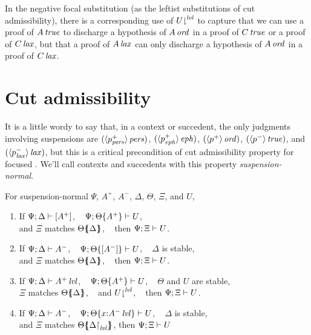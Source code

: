 In the negative focal substitution (as the leftist substitutions of
cut admissibility), there is a corresponding use of
${U}{\downharpoonright}^{{\it lvl}}$ to capture that we can use a proof of
${A}\,{{\it true}}$ to discharge a hypothesis of ${A}\,{{\it ord}}$ in a proof of
${C}\,{{\it true}}$ or a proof of ${C}\,{{\it lax}}$, but that a proof of
${A}\,{{\it lax}}$ can only discharge a hypothesis of ${A}\,{{\it ord}}$ in a proof
of ${C}\,{{\it lax}}$. 



\section{Cut admissibility}
\label{sec:ord-cut}

It is a little wordy to say that, in a context or succedent, the only
judgments involving suspensions are $({\langle {p^+_{\it pers}} \rangle}\,{{\it pers}})$,
$({\langle {p^+_{\it eph}} \rangle}\,{{\it eph}})$, $({\langle {p^+} \rangle}\,{{\it ord}})$,
$({\langle {p^-} \rangle}\,{{\it true}})$, and $({\langle {p^-_{\it lax}} \rangle}\,{{\it lax}})$, but this is a
critical precondition of cut admissibility property for focused
\ollll. We'll call contexts and succedents with this property {\it
  suspension-normal}.

\bigskip
\begin{theorem}\label{thm:ord-cut}
For suspension-normal $\Psi$, $A^+$, $A^-$, $\Delta$, $\Theta$, $\Xi$, and $U$,
\begin{enumerate}
\item If ${\Psi};{\Delta} \vdash {[ A^+ ]} \mathstrut$, ~
         ${\Psi};{{\Theta}\{{A^+}\}} \vdash {U} \mathstrut$,\\
      and $\Xi$ matches ${\Theta}\mbox{$\{\hspace{-4pt}\{$}{{\Delta}}\mbox{$\}\hspace{-4pt}\}$}$, ~
      then ${\Psi};{\Xi} \vdash {U} \mathstrut$.
\item If ${\Psi};{\Delta} \vdash {A^-} \mathstrut$, ~
         ${\Psi};{{\Theta}\{{[A^-]}\}} \vdash {U} \mathstrut$, ~
         $\Delta$ is stable, \\
      and $\Xi$ matches ${\Theta}\mbox{$\{\hspace{-4pt}\{$}{\Delta}\mbox{$\}\hspace{-4pt}\}$}$, ~
      then ${\Psi};{\Xi} \vdash {U} \mathstrut$.
\item If ${\Psi};{\Delta} \vdash {{A^+}\,{{\it lvl}}} \mathstrut$, ~
         ${\Psi};{{\Theta}\{{A^+}\}} \vdash {U} \mathstrut$, ~
         $\Theta$ and $U$ are stable, \\ 
      $\Xi$ matches ${\Theta}\mbox{$\{\hspace{-4pt}\{$}{\Delta}\mbox{$\}\hspace{-4pt}\}$}$, ~
      and ${U}{\downharpoonright}^{{\it lvl}}$, ~
      then ${\Psi};{\Xi} \vdash {U} \mathstrut$.
\item If ${\Psi};{\Delta} \vdash {{A^-}} \mathstrut$, ~
         ${\Psi};{{\Theta}\{{x{:}{A^-}\,{{\it lvl}}}\}} \vdash {U} \mathstrut$, ~
         $\Delta$ is stable, \\ 
      and $\Xi$ matches ${\Theta}\mbox{$\{\hspace{-4pt}\{$}{\ensuremath{{\Delta}{\upharpoonright}_{{\it lvl}}}}\mbox{$\}\hspace{-4pt}\}$}$,
      then ${\Psi};{\Xi} \vdash {U} \mathstrut$
\end{enumerate}
\end{theorem}
\bigskip


